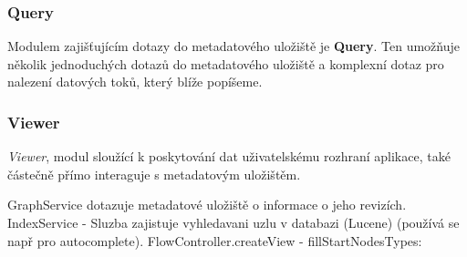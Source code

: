 \subsubsection{Query}


Modulem zajišťujícím dotazy do metadatového uložiště je \textbf{Query}. Ten umožňuje několik jednoduchých dotazů do metadatového uložiště a komplexní dotaz pro nalezení datových toků, který blíže popíšeme.  




\subsubsection{Viewer}
\label{sec:ana_viewer}
\textit{Viewer}, modul sloužící k poskytování dat uživatelskému rozhraní aplikace, také částečně přímo interaguje s metadatovým uložištěm. 

GraphService dotazuje metadatové uložiště o informace o jeho revizích. 
IndexService - Sluzba zajistuje vyhledavani uzlu v databazi (Lucene) (používá se např pro autocomplete).
FlowController.createView
 - fillStartNodesTypes: 




